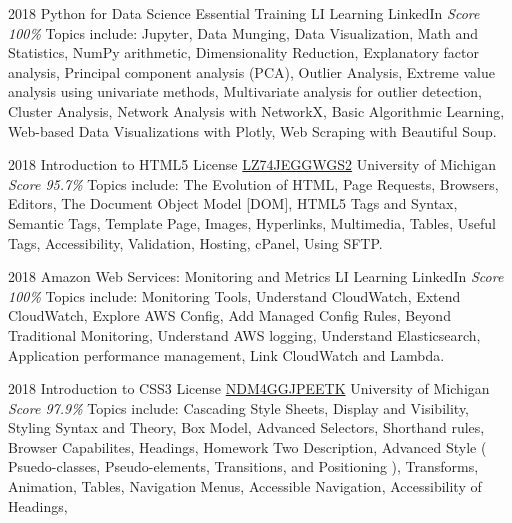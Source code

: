 \documentclass[11pt,a4paper]{moderncv}
\begin{document}
\cventry
    {2018}
    {Python for Data Science Essential Training}
    {LI Learning}
    {LinkedIn}
    {\textit{Score 100\%}}
    {
        Topics include:
            Jupyter,
            Data Munging,
            Data Visualization,
            Math and Statistics,
            NumPy arithmetic,
            Dimensionality Reduction,
            Explanatory factor analysis,
            Principal component analysis (PCA),
            Outlier Analysis,
            Extreme value analysis using univariate methods,
            Multivariate analysis for outlier detection,
            Cluster Analysis,
            Network Analysis with NetworkX,
            Basic Algorithmic Learning,
            Web-based Data Visualizations with Plotly,
            Web Scraping with Beautiful Soup.
    }

\cventry
    {2018}
    {Introduction to HTML5}
    {License
        \href{https://www.coursera.org/account/accomplishments/records/LZ74JEGGWGS2}
        {LZ74JEGGWGS2}
    }
    {University of Michigan}
    {\textit{Score 95.7\%}}
    {
        Topics include:
            The Evolution of HTML,
            Page Requests,
            Browsers,
            Editors,
            The Document Object Model [DOM],
            HTML5 Tags and Syntax,
            Semantic Tags,
            Template Page,
            Images,
            Hyperlinks,
            Multimedia,
            Tables,
            Useful Tags,
            Accessibility,
            Validation,
            Hosting,
            cPanel,
            Using SFTP.
    }

\cventry
    {2018}
    {Amazon Web Services: Monitoring and Metrics}
    {LI Learning}
    {LinkedIn}
    {\textit{Score 100\%}}
    {
        Topics include:
            Monitoring Tools,
            Understand CloudWatch,
            Extend CloudWatch,
            Explore AWS Config,
            Add Managed Config Rules,
            Beyond Traditional Monitoring,
            Understand AWS logging,
            Understand Elasticsearch,
            Application performance management,
            Link CloudWatch and Lambda.
    }

\cventry
    {2018}
    {Introduction to CSS3}
    {License
        \href{https://www.coursera.org/account/accomplishments/records/NDM4GGJPEETK}
        {NDM4GGJPEETK}
    }
    {University of Michigan}
    {\textit{Score 97.9\%}}
    {
        Topics include:
            Cascading Style Sheets,
            Display and Visibility,
            Styling Syntax and Theory,
            Box Model,
            Advanced Selectors,
            Shorthand rules,
            Browser Capabilites,
            Headings,
            Homework Two Description,
            Advanced Style (
                Psuedo-classes,
                Pseudo-elements,
                Transitions,
                and Positioning
            ),
            Transforms,
            Animation,
            Tables,
            Navigation Menus,
            Accessible Navigation,
            Accessibility of Headings,
    }
\end{document}
